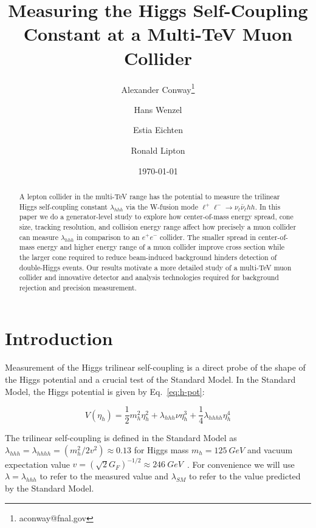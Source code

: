 \documentclass[12pt]{article}
\title{Measuring the Higgs Self-Coupling Constant at a Multi-TeV Muon Collider}
\author[1]{Alexander Conway\thanks{aconway@fnal.gov}}
\author[2]{Hans Wenzel}
\author[2]{Estia Eichten}
\author[2]{Ronald Lipton}
\affil[1]{The University of Chicago\\ 
Faculty Adviser: Young-Kee Kim}
\affil[2]{Fermi National Accelerator Laboratory}
\date{\today}
\begin{document}
\maketitle

\begin{abstract}
	A lepton collider in the multi-TeV range has the potential to measure the trilinear Higgs self-coupling constant $\lambda_{hhh}$ via the W-fusion mode $\ell^+\ell^- \rightarrow \nu_\ell \bar{\nu}_\ell h h$. In this paper we do a generator-level study to explore how center-of-mass energy spread, cone size, tracking resolution, and collision energy range affect how precisely a muon collider can measure $\lambda_{hhh}$ in comparison to an $e^+e^-$ collider. The smaller spread in center-of-mass energy and higher energy range of a muon collider improve cross section while the larger cone required to reduce beam-induced background hinders detection of double-Higgs events. Our results motivate a more detailed study of a multi-TeV muon collider and innovative detector and analysis technologies required for background rejection and precision measurement.
\end{abstract}

\section{Introduction}
Measurement of the Higgs trilinear self-coupling is a direct probe of the shape of the Higgs potential and a crucial test of the Standard Model. In the Standard Model, the Higgs potential is given by Eq.~\ref{eq:h-pot}:

\begin{equation}
	V(\eta_h) = \frac{1}{2}m_h^2\eta_h^2 + \lambda_{hhh}\nu\eta_h^3 + \frac{1}{4}\lambda_{hhhh}\eta_h^4 \label{eq:h-pot}
\end{equation}

The trilinear self-coupling is defined in the Standard Model as $\lambda_{hhh} = \lambda_{hhhh}= (m_h^2/2v^2) \approx 0.13$ for Higgs mass $m_h = 125~GeV$ and vacuum expectation value $v = {(\sqrt{2}G_F)}^{-1/2} \approx 246~GeV$~\cite{goertz}. For convenience we will use $\lambda = \lambda_{hhh}$ to refer to the measured value and $\lambda_{SM}$ to refer to the value predicted by the Standard Model.
\end{document}
